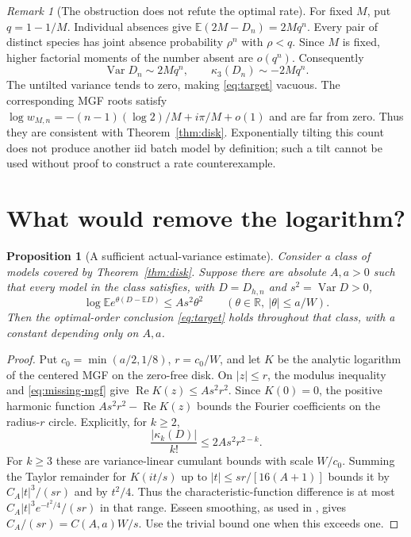 \documentclass[11pt]{article}
\numberwithin{equation}{section}
\newtheorem{proposition}[theorem]{Proposition}
\theoremstyle{remark}\newtheorem{remark}[theorem]{Remark}
\newcommand{\E}{\mathbb E}\newcommand{\Pp}{\mathbb P}
\newcommand{\R}{\mathbb R}\newcommand{\C}{\mathbb C}
\newcommand{\Var}{\operatorname{Var}}\newcommand{\ind}{\mathbf1}
\begin{document}
\begin{remark}[The obstruction does not refute the optimal rate]
For fixed $M$, put $q=1-1/M$. Individual absences give
$\E(2M-D_n)=2Mq^n$. Every pair of distinct species has joint absence
probability $\rho^n$ with $\rho<q$. Since $M$ is fixed, higher factorial
moments of the number absent are $o(q^n)$. Consequently
\[
 \Var D_n\sim2Mq^n,\qquad \kappa_3(D_n)\sim-2Mq^n.
\]
The untilted variance tends to zero, making \eqref{eq:target} vacuous.
The corresponding MGF roots satisfy
$\log w_{M,n}=-(n-1)(\log2)/M+i\pi/M+o(1)$ and are far from zero.
Thus they are consistent with Theorem~\ref{thm:disk}. Exponentially
tilting this count does not produce another iid batch model by definition;
such a tilt cannot be used without proof to construct a rate counterexample.
\end{remark}

\section{What would remove the logarithm?}\label{sec:criterion}
\begin{proposition}[A sufficient actual-variance estimate]\label{prop:criterion}
Consider a class of models covered by Theorem~\ref{thm:disk}.
Suppose there are absolute $A,a>0$ such that every model in the class
satisfies, with $D=D_{h,n}$ and $s^2=\Var D>0$,
\begin{equation}\label{eq:missing-mgf}
 \log\E e^{\theta(D-\E D)}\le A s^2\theta^2
 \qquad (\theta\in\R,\ |\theta|\le a/W).
\end{equation}
Then the optimal-order conclusion \eqref{eq:target} holds throughout
that class, with a constant depending only on $A,a$.
\end{proposition}
\begin{proof}
Put $c_0=\min(a/2,1/8)$, $r=c_0/W$, and let $K$ be the analytic
logarithm of the centered MGF on the zero-free disk. On $|z|\le r$,
the modulus inequality and \eqref{eq:missing-mgf} give
$\operatorname{Re}K(z)\le A s^2r^2$. Since $K(0)=0$, the positive
harmonic function $A s^2r^2-\operatorname{Re}K(z)$ bounds the Fourier
coefficients on the radius-$r$ circle. Explicitly, for $k\ge2$,
\[
 \frac{|\kappa_k(D)|}{k!}\le2A s^2r^{2-k}.
\]
For $k\ge3$ these are variance-linear cumulant bounds with scale
$W/c_0$. Summing the Taylor remainder for $K(it/s)$ up to
$|t|\le sr/[16(A+1)]$ bounds it by $C_A|t|^3/(sr)$ and by $t^2/4$.
Thus the characteristic-function difference is at most
$C_A|t|^3e^{-t^2/4}/(sr)$ in that range. Esseen smoothing, as used in
\cite[Section~5]{LongOptimal}, gives $C_A/(sr)=C(A,a)W/s$.
Use the trivial bound one when this exceeds one.
\end{proof}
\end{document}
